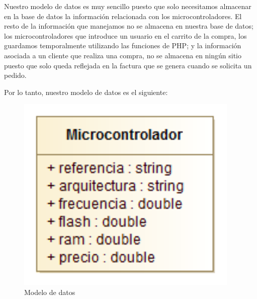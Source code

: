 Nuestro modelo de datos es muy sencillo puesto que solo necesitamos almacenar en la base de datos
la información relacionada con los microcontroladores. El resto de la información que manejamos no
se almacena en nuestra base de datos; los microcontroladores que introduce un usuario en el carrito de 
la compra, los guardamos temporalmente utilizando las funciones de PHP; y la información asociada a un 
cliente que realiza una compra, no se almacena en ningún sitio puesto que solo queda reflejada en la factura
que se genera cuando se solicita un pedido. 

Por lo tanto, nuestro modelo de datos es el siguiente:

\begin{figure}[h!]
\centering
\includegraphics[width=0.95\textwidth]{img/modelo_datos}
\caption{Modelo de datos}
 \label{fig:modelo_datos}
\end{figure}

